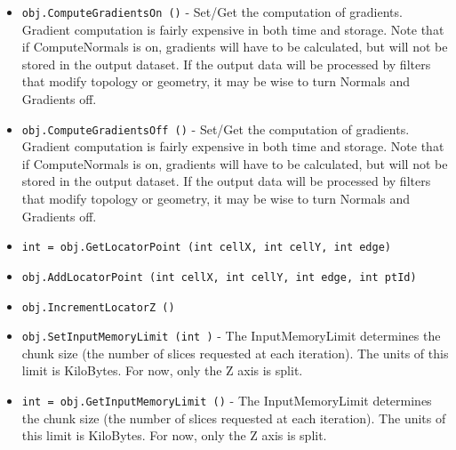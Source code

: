 \begin{itemize}
\item  \verb|obj.ComputeGradientsOn ()| -  Set/Get the computation of gradients. Gradient computation is fairly expensive
 in both time and storage. Note that if ComputeNormals is on, gradients will
 have to be calculated, but will not be stored in the output dataset.
 If the output data will be processed by filters that modify topology or
 geometry, it may be wise to turn Normals and Gradients off.

\item  \verb|obj.ComputeGradientsOff ()| -  Set/Get the computation of gradients. Gradient computation is fairly expensive
 in both time and storage. Note that if ComputeNormals is on, gradients will
 have to be calculated, but will not be stored in the output dataset.
 If the output data will be processed by filters that modify topology or
 geometry, it may be wise to turn Normals and Gradients off.

\item  \verb|int = obj.GetLocatorPoint (int cellX, int cellY, int edge)|

\item  \verb|obj.AddLocatorPoint (int cellX, int cellY, int edge, int ptId)|

\item  \verb|obj.IncrementLocatorZ ()|

\item  \verb|obj.SetInputMemoryLimit (int )| -  The InputMemoryLimit determines the chunk size (the number of slices
 requested at each iteration).  The units of this limit is KiloBytes.
 For now, only the Z axis is split.

\item  \verb|int = obj.GetInputMemoryLimit ()| -  The InputMemoryLimit determines the chunk size (the number of slices
 requested at each iteration).  The units of this limit is KiloBytes.
 For now, only the Z axis is split.

\end{itemize}
